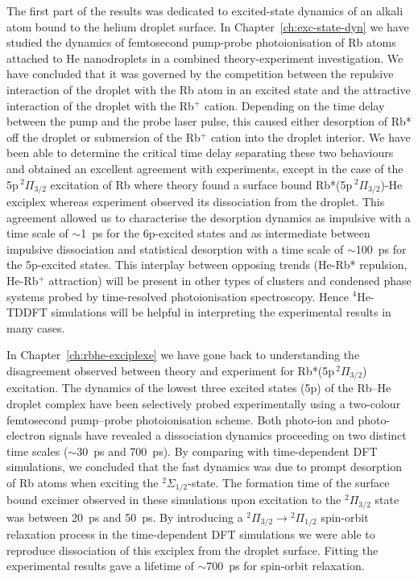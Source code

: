 The first part of the results was dedicated to excited-state dynamics of an alkali atom bound to the helium droplet surface. In Chapter~\ref{ch:exc-state-dyn} we have studied the dynamics of femtosecond pump-probe photoionisation of Rb atoms attached to He nanodroplets in a combined theory-experiment investigation. We have concluded that it was governed by the competition between the repulsive interaction of the droplet with the Rb atom in an excited state and the attractive interaction of the droplet with the Rb$^+$ cation. Depending on the time delay between the pump and the probe laser pulse, this caused either desorption of Rb* off the droplet or submersion of the Rb$^+$ cation into the droplet interior. We have been able to determine the critical time delay separating these two behaviours and obtained an excellent agreement with experiments, except in the case of the 5p$\,^2\Pi_{3/2}$ excitation of Rb where theory found a surface bound Rb*(5p$\,^2\Pi_{3/2}$)-He exciplex whereas experiment observed its dissociation from the droplet. This agreement allowed us to characterise the desorption dynamics as impulsive with a time scale of $\sim$1~ps for the 6p-excited states and as intermediate between impulsive dissociation and statistical desorption with a time scale of $\sim$100~ps for the 5p-excited states. This interplay between opposing trends (He-Rb* repulsion, He-Rb$^+$ attraction) will be present in other types of clusters and condensed phase systems probed by time-resolved photoionisation spectroscopy. Hence $^4$He-TDDFT simulations will be helpful in interpreting the experimental results in many cases.

In Chapter~\ref{ch:rbhe-exciplexe} we have gone back to understanding the disagreement observed between theory and experiment for Rb*(5p$\,^2\Pi_{3/2}$) excitation. The dynamics of the lowest three excited states (5p) of the Rb–He droplet complex have been selectively probed experimentally using a two-colour femtosecond pump–probe photoionisation scheme. Both photo-ion and photo-electron signals have revealed a dissociation dynamics proceeding on two distinct time scales ($\sim$30~ps and 700~ps). By comparing with time-dependent DFT simulations, we concluded that the fast dynamics was due to prompt desorption of Rb atoms when exciting the $^2\Sigma_{1/2}$-state. The formation time of the surface bound excimer observed in these simulations upon excitation to the $^2\Pi_{3/2}$ state was between 20~ps and 50~ps. By introducing a $^2\Pi_{3/2}\!\!\longrightarrow\!\!^2\Pi_{1/2}$ spin-orbit relaxation process in the time-dependent DFT simulations we were able to reproduce dissociation of this exciplex from the droplet surface. Fitting the experimental results gave a lifetime of $\sim$700~ps for spin-orbit relaxation.

